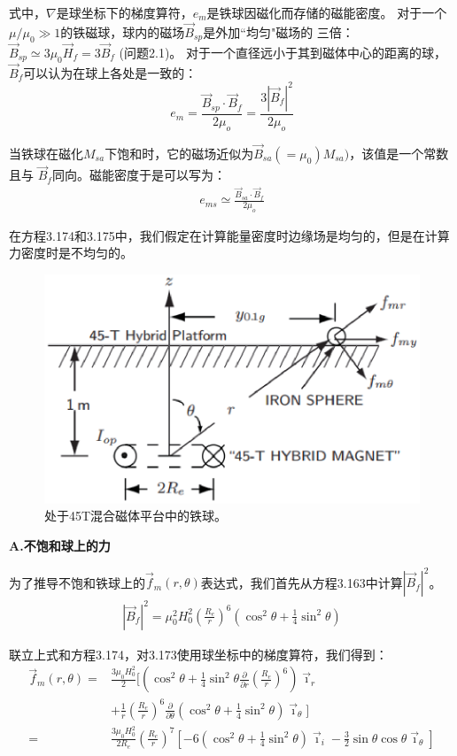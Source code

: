 式中，$\nabla$是球坐标下的梯度算符，$e_m$是铁球因磁化而存储的磁能密度。
对于一个$\mu/\mu_0\gg 1$的铁磁球，球内的磁场$\vec{B}_{sp}$是外加``均匀"磁场的
三倍：$\vec{B}_{sp}\simeq 3\mu_0 \vec{H}_f= 3\vec{B}_f$ (问题2.1)。
对于一个直径远小于其到磁体中心的距离的球，$\vec{B}_f$可以认为在球上各处是一致的：
\begin{equation}
e_{m}=\frac{\vec{B}_{sp}\cdot\vec{B}_{f}}{2\mu_{o}}=\frac{3|\vec{B}_{f}|^{2}}{2\mu_{o}}%
\end{equation}

当铁球在磁化$M_{sa}$下饱和时，它的磁场近似为$\vec{B}_{sa} (= \mu_{0}) M_{sa})$，该值是一个常数且与
$\vec{B}_f$同向。磁能密度于是可以写为：
\begin{align}
e_{ms}\simeq\frac{\vec{B}_{sa}\cdot\vec{B}_{f}}{2\mu_{o}}%
\end{align}

在方程3.174和3.175中，我们假定在计算能量密度时边缘场是均匀的，但是在计算力密度时是不均匀的。
\begin{figure}[htbp]
	\centering
	\includegraphics[scale=0.7]{chpt3/figs/fig3.46.eps}
	\caption{处于45T混合磁体平台中的铁球。}
\end{figure}

\textbf{A.不饱和球上的力}

为了推导不饱和铁球上的$\vec{f}_{m}(r,\theta)$表达式，我们首先从方程3.163中计算$|\vec{B}_f|^2$。
\begin{align*}
|\vec{B}_f|^2=\mu_0^2 H_0^2\left(\frac{R_e}{r}\right)^6(\cos^2\theta+\frac{1}{4}\sin^2\theta)
\end{align*}

联立上式和方程3.174，对3.173使用球坐标中的梯度算符，我们得到：
\begin{align*}
\vec{f}_{m}(r,\theta)=&\frac{3\mu_0 H_0^2}{2}\bigg[(\cos^2\theta+\frac{1}{4}\sin^2\theta\frac{\partial}{\partial r}(\frac{R_e}{r})^6)\vec{\imath}_r\\
&+\frac{1}{r}(\frac{R_e}{r})^6\frac{\partial}{\partial \theta}(\cos^2\theta+\frac{1}{4}\sin^2\theta)\vec{\imath}_\theta\bigg]\\
=&\frac{3\mu_0 H_0^2}{2R_e}(\frac{R_e}{r})^7\left[-6(\cos^2\theta+\frac{1}{4}\sin^2\theta)\vec{\imath}_i-\frac{3}{2}\sin\theta\cos\theta\vec{\imath}_\theta\right]
\end{align*}

